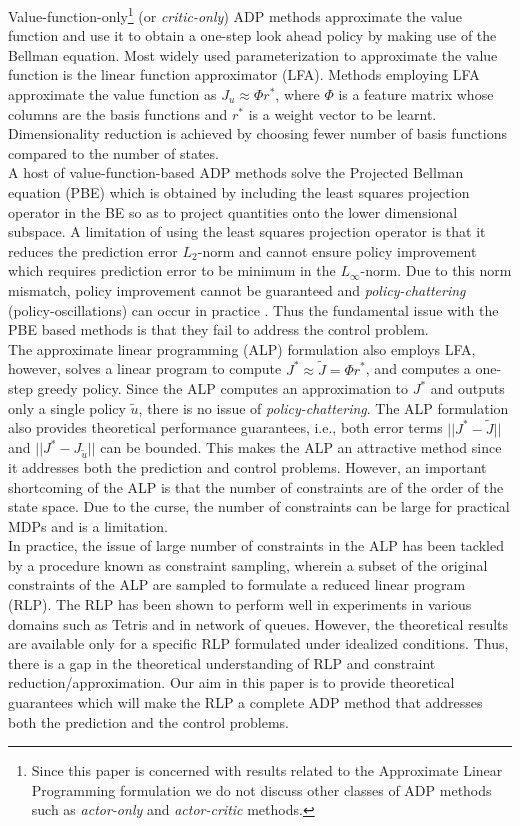 \documentclass[12pt,draftcls,onecolumn]{IEEEtran}
\begin{document}
Value-function-only\footnote{Since this paper is concerned with results related to the Approximate Linear Programming formulation we do not discuss other classes of ADP methods such as \emph{actor-only} and \emph{actor-critic} methods.} (or \emph{critic-only}) ADP methods approximate the value function and use it to obtain a one-step look ahead policy by making use of the Bellman equation. Most widely used parameterization to approximate the value function is the linear function approximator (LFA). Methods employing LFA approximate the value function as $J_u\approx\Phi r^*$, where $\Phi$ is a feature matrix whose columns are the basis functions and $r^*$ is a weight vector to be learnt. Dimensionality reduction is achieved by choosing fewer number of basis functions compared to the number of states.\\
A host of value-function-based ADP methods solve the Projected Bellman equation (PBE) which is obtained by including the least squares projection operator in the BE so as to project quantities onto the lower dimensional subspace. A limitation of using the least squares projection operator is that it reduces the prediction error $L_2$-norm and cannot ensure policy improvement which requires prediction error to be minimum in the $L_\infty$-norm. Due to this norm mismatch, policy improvement cannot be guaranteed and \emph{policy-chattering} (policy-oscillations) can occur in practice \cite{dpchapter}. Thus the fundamental issue with the PBE based methods is that they fail to address the control problem.\\
The approximate linear programming (ALP) \cite{ALP,CS,SALP,ALP-Bor,gkp,fs,npalp} formulation also employs LFA, however, solves a linear program to compute $J^*\approx\tilde{J}=\Phi r^*$, and computes a one-step greedy policy. Since the ALP computes an approximation to $J^*$ and outputs only a single policy $\tilde{u}$, there is no issue of \emph{policy-chattering}. The ALP formulation also provides theoretical performance guarantees, i.e., both error terms $||J^*-\tilde{J}||$ and $||J^*-J_{\tilde{u}}||$ can be bounded. This makes the ALP an attractive method since it addresses both the prediction and control problems. However, an important shortcoming of the ALP is that the number of constraints are of the order of the state space. Due to the curse, the number of constraints can be large for practical MDPs and is a limitation.\\
In practice, the issue of large number of constraints in the ALP has been tackled by a procedure known as constraint sampling, wherein a subset of the original constraints of the ALP are sampled to formulate a reduced linear program (RLP). The RLP has been shown to perform well in experiments \cite{ALP,CS,CST} in various domains such as Tetris and in network of queues. However, the theoretical results \cite{CS} are available only for a specific RLP formulated under idealized conditions. Thus, there is a gap in the theoretical understanding of RLP and constraint reduction/approximation. Our aim in this paper is to provide theoretical guarantees which will make the RLP a complete ADP method that addresses both the prediction and the control problems.\\
\end{document}
